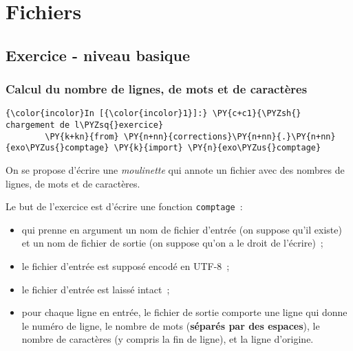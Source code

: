     
    
    
    

    

    \hypertarget{fichiers}{%
\section{Fichiers}\label{fichiers}}

    \hypertarget{exercice---niveau-basique}{%
\subsection{Exercice - niveau basique}\label{exercice---niveau-basique}}

    \hypertarget{calcul-du-nombre-de-lignes-de-mots-et-de-caractuxe8res}{%
\subsubsection{Calcul du nombre de lignes, de mots et de
caractères}\label{calcul-du-nombre-de-lignes-de-mots-et-de-caractuxe8res}}

    \begin{Verbatim}[commandchars=\\\{\}]
{\color{incolor}In [{\color{incolor}1}]:} \PY{c+c1}{\PYZsh{} chargement de l\PYZsq{}exercice}
        \PY{k+kn}{from} \PY{n+nn}{corrections}\PY{n+nn}{.}\PY{n+nn}{exo\PYZus{}comptage} \PY{k}{import} \PY{n}{exo\PYZus{}comptage}
\end{Verbatim}


    On se propose d'écrire une \emph{moulinette} qui annote un fichier avec
des nombres de lignes, de mots et de caractères.

Le but de l'exercice est d'écrire une fonction \texttt{comptage}~:

\begin{itemize}
\tightlist
\item
  qui prenne en argument un nom de fichier d'entrée (on suppose qu'il
  existe) et un nom de fichier de sortie (on suppose qu'on a le droit de
  l'écrire)~;
\item
  le fichier d'entrée est supposé encodé en UTF-8~;
\item
  le fichier d'entrée est laissé intact~;
\item
  pour chaque ligne en entrée, le fichier de sortie comporte une ligne
  qui donne le numéro de ligne, le nombre de mots (\textbf{séparés par
  des espaces}), le nombre de caractères (y compris la fin de ligne), et
  la ligne d'origine.
\end{itemize}

